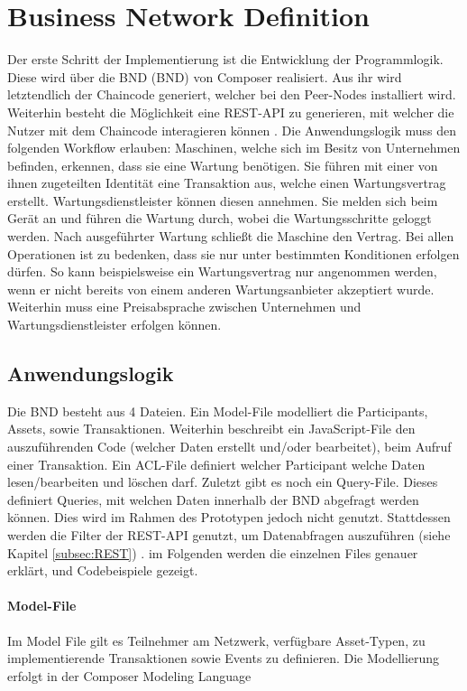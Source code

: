 \section{Business Network Definition}
Der erste Schritt der Implementierung ist die Entwicklung der Programmlogik. Diese wird über die \acl{BND} (\acs{BND}) von Composer realisiert. Aus ihr wird letztendlich der Chaincode generiert, welcher bei den Peer-Nodes installiert wird. Weiterhin besteht die Möglichkeit eine REST-API zu generieren, mit welcher die Nutzer mit dem Chaincode interagieren können \cite{HyperledgerComposerTeamDeveloperTutorialHyperledger}. Die Anwendungslogik muss den folgenden Workflow erlauben: Maschinen, welche sich im Besitz von Unternehmen befinden, erkennen, dass sie eine Wartung benötigen. Sie führen mit einer von ihnen zugeteilten Identität eine Transaktion aus, welche einen Wartungsvertrag erstellt. Wartungsdienstleister können diesen annehmen. Sie melden sich beim Gerät an und führen die Wartung durch, wobei die Wartungsschritte geloggt werden. Nach ausgeführter Wartung schließt die Maschine den Vertrag. Bei allen Operationen ist zu bedenken, dass sie nur unter bestimmten Konditionen erfolgen dürfen. So kann beispielsweise ein Wartungsvertrag nur angenommen werden, wenn er nicht bereits von einem anderen Wartungsanbieter akzeptiert wurde. Weiterhin muss eine Preisabsprache zwischen Unternehmen und Wartungsdienstleister erfolgen können. 

\subsection{Anwendungslogik}
Die \acs{BND} besteht aus 4 Dateien. Ein Model-File modelliert die Participants, Assets, sowie Transaktionen. Weiterhin beschreibt ein JavaScript-File den auszuführenden Code (welcher Daten erstellt und/oder bearbeitet), beim Aufruf einer Transaktion. Ein ACL-File definiert welcher Participant welche Daten lesen/bearbeiten und löschen darf. Zuletzt gibt es noch ein Query-File. Dieses definiert Queries, mit welchen Daten innerhalb der \acs{BND} abgefragt werden können. Dies wird im Rahmen des Prototypen jedoch nicht genutzt. Stattdessen werden die Filter der REST-API genutzt, um Datenabfragen auszuführen (siehe Kapitel \ref{subsec:REST}) \cite{HyperledgerComposerTeamIntroductionHyperledgerComposer}. im Folgenden werden die einzelnen Files genauer erklärt, und Codebeispiele gezeigt.

\paragraph{Model-File}
Im Model File gilt es Teilnehmer am Netzwerk, verfügbare Asset-Typen, zu implementierende Transaktionen sowie Events zu definieren. Die Modellierung erfolgt in der Composer Modeling Language \cite{HyperledgerComposerTeamModelingLanguageHyperledger}

